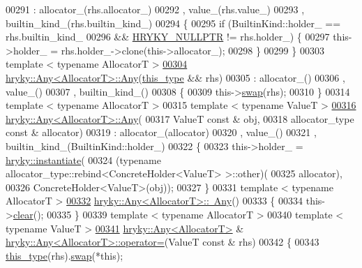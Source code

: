 \begin{DoxyCode}
00291     : allocator\_(rhs.allocator\_)
00292       , value\_(rhs.value\_)
00293       , builtin\_kind\_(rhs.builtin\_kind\_)
00294 \{
00295     \textcolor{keywordflow}{if} (BuiltinKind::holder\_ == rhs.builtin\_kind\_
00296         && \hyperlink{common_8h_a4cd4ac09cfcdbd6b30ee69afc156e210}{HRYKY_NULLPTR} != rhs.holder\_) \{
00297         this->holder\_ = rhs.holder\_->clone(this->allocator\_);
00298     \}
00299 \}
00303 \textcolor{keyword}{template} < \textcolor{keyword}{typename} AllocatorT >
\hypertarget{any_8h_source_l00304}{}\hyperlink{classhryky_1_1_any_a4ceb1ab2d59e3d07a6dd1186ecb2b2c5}{00304} \hyperlink{classhryky_1_1_any}{hryky::Any<AllocatorT>::Any}(\hyperlink{classhryky_1_1_any}{this_type} && rhs)
00305     : allocator\_()
00306       , value\_()
00307       , builtin\_kind\_()
00308 \{
00309     this->\hyperlink{classhryky_1_1_any_a1603aaa3243f8aaae407c6a5e4287bb6}{swap}(rhs);
00310 \}
00314 \textcolor{keyword}{template} < \textcolor{keyword}{typename} AllocatorT >
00315 \textcolor{keyword}{template} < \textcolor{keyword}{typename} ValueT >
\hypertarget{any_8h_source_l00316}{}\hyperlink{classhryky_1_1_any_a1634e976c18ada5c81aec15178cc9c4f}{00316} \hyperlink{classhryky_1_1_any}{hryky::Any<AllocatorT>::Any}(
00317     ValueT \textcolor{keyword}{const} & obj,
00318     allocator\_type \textcolor{keyword}{const} & allocator)
00319     : allocator\_(allocator)
00320       , value\_()
00321       , builtin\_kind\_(BuiltinKind::holder\_)
00322 \{
00323     this->holder\_ = \hyperlink{namespacehryky_a7e731db6d90571cf1aea6e113d43b6ad}{hryky::instantiate}(
00324         (\textcolor{keyword}{typename} allocator\_type::rebind<ConcreteHolder<ValueT> >::other)(
00325             allocator),
00326         ConcreteHolder<ValueT>(obj));
00327 \}
00331 \textcolor{keyword}{template} < \textcolor{keyword}{typename} AllocatorT >
\hypertarget{any_8h_source_l00332}{}\hyperlink{classhryky_1_1_any_a703e5beebe52102b0db2cef37f92df3f}{00332} \hyperlink{classhryky_1_1_any}{hryky::Any<AllocatorT>::~Any}()
00333 \{
00334     this->\hyperlink{namespacehryky_aa201297ea9530da954a7230be71cc19d}{clear}();
00335 \}
00339 \textcolor{keyword}{template} < \textcolor{keyword}{typename} AllocatorT >
00340 \textcolor{keyword}{template} < \textcolor{keyword}{typename} ValueT >
\hypertarget{any_8h_source_l00341}{}\hyperlink{classhryky_1_1_any_a84875d62c0f9f76ddcfb896b8ab6a275}{00341} \hyperlink{classhryky_1_1_any}{hryky::Any<AllocatorT>} & \hyperlink{classhryky_1_1_any}{hryky::Any<AllocatorT>::operator=}(ValueT \textcolor{keyword}{const} & rhs)
00342 \{
00343     \hyperlink{classhryky_1_1_any}{this_type}(rhs).\hyperlink{classhryky_1_1_any_a1603aaa3243f8aaae407c6a5e4287bb6}{swap}(*\textcolor{keyword}{this});

\end{DoxyCode}
